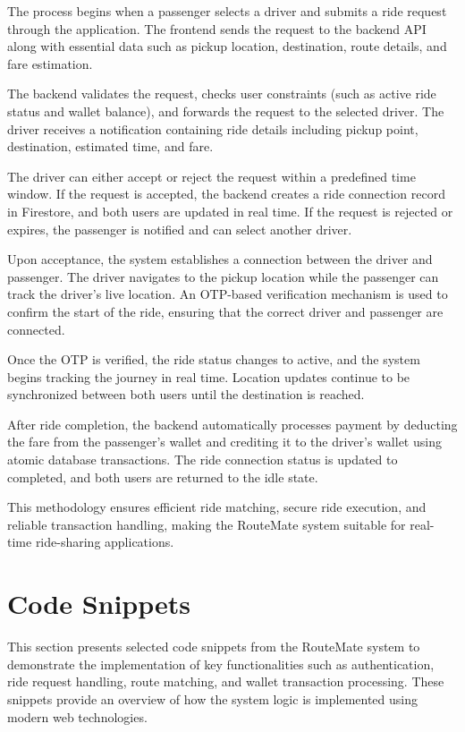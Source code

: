 \documentclass[10pt,a4paper]{report}
\begin{document}
\justify\large The process begins when a passenger selects a driver and submits a ride request through the application. The frontend sends the request to the backend API along with essential data such as pickup location, destination, route details, and fare estimation.

\justify\large The backend validates the request, checks user constraints (such as active ride status and wallet balance), and forwards the request to the selected driver. The driver receives a notification containing ride details including pickup point, destination, estimated time, and fare.

\justify\large The driver can either accept or reject the request within a predefined time window. If the request is accepted, the backend creates a ride connection record in Firestore, and both users are updated in real time. If the request is rejected or expires, the passenger is notified and can select another driver.

\justify\large Upon acceptance, the system establishes a connection between the driver and passenger. The driver navigates to the pickup location while the passenger can track the driver’s live location. An OTP-based verification mechanism is used to confirm the start of the ride, ensuring that the correct driver and passenger are connected.

\justify\large Once the OTP is verified, the ride status changes to active, and the system begins tracking the journey in real time. Location updates continue to be synchronized between both users until the destination is reached.

\justify\large After ride completion, the backend automatically processes payment by deducting the fare from the passenger’s wallet and crediting it to the driver’s wallet using atomic database transactions. The ride connection status is updated to completed, and both users are returned to the idle state.

\justify\large This methodology ensures efficient ride matching, secure ride execution, and reliable transaction handling, making the RouteMate system suitable for real-time ride-sharing applications.

\section{Code Snippets}

\justify\large This section presents selected code snippets from the RouteMate system to demonstrate the implementation of key functionalities such as authentication, ride request handling, route matching, and wallet transaction processing. These snippets provide an overview of how the system logic is implemented using modern web technologies.
\end{document}
